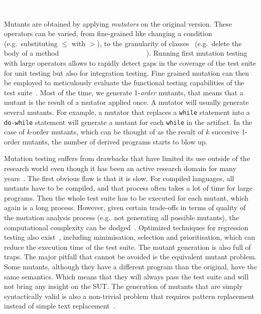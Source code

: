 \documentclass[a4paper,11pt]{sdm_internship}
\newcommand{\addref}[1]{\colorbox{TealBlue!100}{\textcolor{white}{\textbf{$[$\ifx&#1&\ \else#1\fi$]$}}}}
\newcommand{\todo}[1]{\colorbox{Red!75}{\textcolor{white}{\textbf{TODO\ifx&#1&\else: #1\fi}}}}
\theoremstyle{definition}
\begin{document}
\addref{fundational papers}


Mutants are obtained by applying \emph{mutators} on the original version.
These operators can be varied, from fine-grained like changing a condition (e.g.\ substituting $\leq$ with $>$), to the granularity of classes~\cite{segura2011mutation} (e.g.\ delete the body of a method \addref{descartes}).
Running first mutation testing with large operators allows to rapidly detect gaps in the coverage of the test suite for unit testing but also for integration testing.
Fine grained mutation can then be employed to meticulously evaluate the functional testing capabilities of the test suite~\cite{howden1982weak}.
Most of the time, we generate 1-\emph{order} mutants, that means that a mutant is the result of a mutator applied once.
A mutator will usually generate several mutants.
For example, a mutator that replaces a \texttt{while} statement into a \texttt{do-while} statement will generate a mutant for each \texttt{while} in the artifact.
In the case of $k$-order mutants, which can be thought of as the result of $k$ succesive 1-order mutants\cite{wah2000theoretical}, the number of derived programs starts to blow up.

Mutation testing suffers from drawbacks that have limited its use outside of the research world even though it has been an active research domain for many years~\cite{jia2011analysis}.
The first obvious flaw is that it is slow.
For compiled languages, all mutants have to be compiled, and that process often takes a lot of time for large programs.
Then the whole test suite has to be executed for each mutant, which again is a long process.
However, given certain trade-offs in terms of quality of the mutation analysis process (e.g.\ not generating all possible mutants), the computational complexity can be dodged~\cite{offutt1993experimental,movzucha2016mutation}.
Optimized techniques for regression testing also exist~\cite{yoo2012regression}, including minimisation, selection and prioritisation, which can reduce the execution time of the test suite.
The mutant generation is also full of traps.
The major pitfall that cannot be avoided is the equivalent mutant problem.
Some mutants, although they have a different program than the original, have the same semantics.
Which means that they will always pass the test suite and will not bring any insight on the SUT\@.
The generation of mutants that are simply syntactically valid is also a non-trivial problem that requires pattern replacement instead of simple text replacement~\cite{simao2009transformational}.
\end{document}
